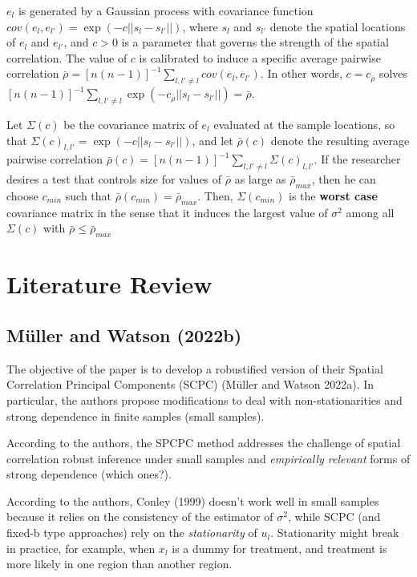 \documentclass[
]{article}
\begin{document}
\(e_l\) is generated by a Gaussian process with covariance function
\(cov(e_l,e_{l'})=\exp(-c||s_l-s_{l'}||)\), where \(s_l\) and \(s_{l'}\)
denote the spatial locations of \(e_l\) and \(e_{l'}\), and \(c>0\) is a
parameter that governs the strength of the spatial correlation. The
value of \(c\) is calibrated to induce a specific average pairwise
correlation
\(\bar{\rho}=[n(n-1)]^{-1}\sum_{l,l'\not=l}cov(e_l,e_{l'})\). In other
words, \(c=c_{\bar{\rho}}\) solves
\([n(n-1)]^{-1}\sum_{l,l'\not=l}\exp(-c_{\bar{\rho}}||s_l-s_{l'}||)=\bar{\rho}\).

Let \(\Sigma(c)\) be the covariance matrix of \(e_l\) evaluated at the
sample locations, so that \(\Sigma(c)_{l,l'}=\exp(-c||s_l-s_{l'} ||)\),
and let \(\bar{\rho}(c)\) denote the resulting average pairwise
correlation
\(\bar{\rho}(c)=[n(n-1)]^{-1}\sum_{l,l'\not=l}\Sigma(c)_{l,l'}\). If the
researcher desires a test that controls size for values of
\(\bar{\rho}\) as large as \(\bar{\rho}_{max}\), then he can choose
\(c_{min}\) such that \(\bar{\rho}(c_{min})=\bar{\rho}_{max}\). Then,
\(\Sigma(c_{min})\) is the \textbf{worst case} covariance matrix in the
sense that it induces the largest value of \(\sigma^2\) among all
\(\Sigma(c)\) with \(\bar{\rho}\le \bar{\rho}_{max}\)

\hypertarget{literature-review}{%
\section{Literature Review}\label{literature-review}}

\hypertarget{muller2022jbes}{%
\subsection{Müller and Watson (2022b)}\label{muller2022jbes}}

The objective of the paper is to develop a robustified version of their
Spatial Correlation Principal Components (SCPC) (Müller and Watson
2022a). In particular, the authors propose modifications to deal with
non-stationarities and strong dependence in finite samples (small
samples).

According to the authors, the SPCPC method addresses the challenge of
spatial correlation robust inference under small samples and
\emph{empirically relevant} forms of strong dependence (which ones?).

According to the authors, Conley (1999) doesn't work well in small
samples because it relies on the consistency of the estimator of
\(\sigma^2\), while SCPC (and fixed-b type approaches) rely on the
\emph{stationarity} of \(u_l\). Stationarity might break in practice,
for example, when \(x_l\) is a dummy for treatment, and treatment is
more likely in one region than another region.
\end{document}
